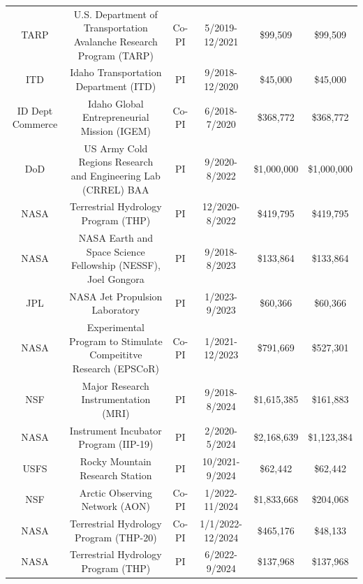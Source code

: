 \documentclass[11pt]{article}
\begin{document}
\begin{table}[!htbp]
\begin{tabular}{cccccc}
TARP             & U.S. Department of Transportation Avalanche Research Program (TARP)     & Co-PI & 5/2019-12/2021   & \$99,509     & \$99,509  \\
ITD              & Idaho Transportation Department (ITD)                                   & PI    & 9/2018-12/2020   & \$45,000     & \$45,000  \\
ID Dept Commerce & Idaho Global Entrepreneurial Mission (IGEM)                             & Co-PI & 6/2018-7/2020    & \$368,772    & \$368,772  \\
DoD              & US Army Cold Regions Research and Engineering Lab (CRREL) BAA           & PI    & 9/2020-8/2022    & \$1,000,000  & \$1,000,000   \\
NASA             & Terrestrial Hydrology Program (THP)                                     & PI    & 12/2020-8/2022   & \$419,795    & \$419,795 \\
NASA             & NASA Earth and Space Science Fellowship (NESSF), Joel Gongora           & PI    & 9/2018-8/2023    & \$133,864    & \$133,864  \\
JPL              & NASA Jet Propulsion Laboratory                                          & PI    & 1/2023-9/2023    & \$60,366     & \$60,366  \\
NASA             & Experimental Program to Stimulate Compeititve Research (EPSCoR)         & Co-PI & 1/2021-12/2023   & \$791,669    & \$527,301  \\
NSF              & Major Research Instrumentation (MRI)                                    & PI    & 9/2018-8/2024    & \$1,615,385  & \$161,883 \\
NASA             & Instrument Incubator Program (IIP-19)                                   & PI    & 2/2020-5/2024    & \$2,168,639  & \$1,123,384 \\
USFS             & Rocky Mountain Research Station                                         & PI    & 10/2021-9/2024   & \$62,442     & \$62,442  \\
NSF              & Arctic Observing Network (AON)                                          & Co-PI & 1/2022-11/2024   & \$1,833,668  & \$204,068  \\
NASA             & Terrestrial Hydrology Program (THP-20)                                  & Co-PI & 1/1/2022-12/2024 & \$465,176    & \$48,133  \\
NASA             & Terrestrial Hydrology Program (THP)                                     & PI    & 6/2022-9/2024    & \$137,968    & \$137,968  \\

\end{tabular}
\end{table}
\end{document}
